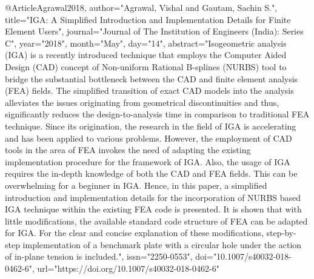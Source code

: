 @Article{Agrawal2018,
author="Agrawal, Vishal
and Gautam, Sachin S.",
title="IGA: A Simplified Introduction and Implementation Details for Finite Element Users",
journal="Journal of The Institution of Engineers (India): Series C",
year="2018",
month="May",
day="14",
abstract="Isogeometric analysis (IGA) is a recently introduced technique that employs the Computer Aided Design (CAD) concept of Non-uniform Rational B-splines (NURBS) tool to bridge the substantial bottleneck between the CAD and finite element analysis (FEA) fields. The simplified transition of exact CAD models into the analysis alleviates the issues originating from geometrical discontinuities and thus, significantly reduces the design-to-analysis time in comparison to traditional FEA technique. Since its origination, the research in the field of IGA is accelerating and has been applied to various problems. However, the employment of CAD tools in the area of FEA invokes the need of adapting the existing implementation procedure for the framework of IGA. Also, the usage of IGA requires the in-depth knowledge of both the CAD and FEA fields. This can be overwhelming for a beginner in IGA. Hence, in this paper, a simplified introduction and implementation details for the incorporation of NURBS based IGA technique within the existing FEA code is presented. It is shown that with little modifications, the available standard code structure of FEA can be adapted for IGA. For the clear and concise explanation of these modifications, step-by-step implementation of a benchmark plate with a circular hole under the action of in-plane tension is included.",
issn="2250-0553",
doi="10.1007/s40032-018-0462-6",
url="https://doi.org/10.1007/s40032-018-0462-6"
}

